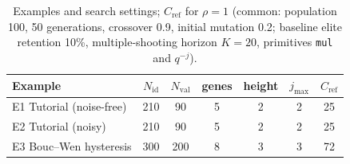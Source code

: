 \begin{table}[t]
\centering
\caption{Examples and search settings; $C_\mathrm{ref}$ for $\rho=1$ (common: population 100, 50 generations, crossover 0.9, initial mutation 0.2; baseline elite retention 10\%, multiple-shooting horizon $K=20$, primitives \texttt{mul} and $q^{-j}$).}
\label{tab:setup}
\setlength{\tabcolsep}{4pt}
\begin{tabular}{lcccccc}
\toprule
Example & $N_\mathrm{id}$ & $N_\mathrm{val}$ & genes & height & $j_{\max}$ & $C_\mathrm{ref}$ \\
\midrule
E1 Tutorial (noise-free) & 210 & 90 & 5 & 2 & 2 & 25 \\
E2 Tutorial (noisy) & 210 & 90 & 5 & 2 & 2 & 25 \\
E3 Bouc--Wen hysteresis & 300 & 200 & 8 & 3 & 3 & 72 \\
\bottomrule
\end{tabular}
\end{table}
